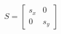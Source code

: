\documentclass[preview]{standalone}
\begin{document}
\begin{align*}
S = \begin{bmatrix} s_x & 0 \\ 0 & s_y \end{bmatrix}
\end{align*}
\end{document}
